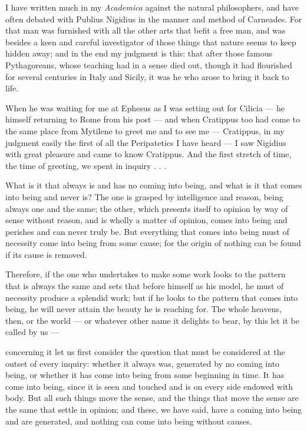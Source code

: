 
 I have written much in my \textit{Academica} against the natural philosophers, and have often debated with Publius Nigidius in the manner and method of Carneades. For that man was furnished with all the other arts that befit a free man, and was besides a keen and careful investigator of those things that nature seems to keep hidden away; and in the end my judgment is this: that after those famous Pythagoreans, whose teaching had in a sense died out, though it had flourished for several centuries in Italy and Sicily, it was he who arose to bring it back to life.

 When he was waiting for me at Ephesus as I was setting out for Cilicia — he himself returning to Rome from his post — and when Cratippus too had come to the same place from Mytilene to greet me and to see me — Cratippus, in my judgment easily the first of all the Peripatetics I have heard — I saw Nigidius with great pleasure and came to know Cratippus. And the first stretch of time, the time of greeting, we spent in inquiry . . .

 What is it that always is and has no coming into being, and what is it that comes into being and never is? The one is grasped by intelligence and reason, being always one and the same; the other, which presents itself to opinion by way of sense without reason, and is wholly a matter of opinion, comes into being and perishes and can never truly be. But everything that comes into being must of necessity come into being from some cause; for the origin of nothing can be found if its cause is removed.

 Therefore, if the one who undertakes to make some work looks to the pattern that is always the same and sets that before himself as his model, he must of necessity produce a splendid work; but if he looks to the pattern that comes into being, he will never attain the beauty he is reaching for. The whole heavens, then, or the world — or whatever other name it delights to bear, by this let it be called by us —

 concerning it let us first consider the question that must be considered at the outset of every inquiry: whether it always was, generated by no coming into being, or whether it has come into being from some beginning in time. It has come into being, since it is seen and touched and is on every side endowed with body. But all such things move the sense, and the things that move the sense are the same that settle in opinion; and these, we have said, have a coming into being and are generated, and nothing can come into being without causes.

